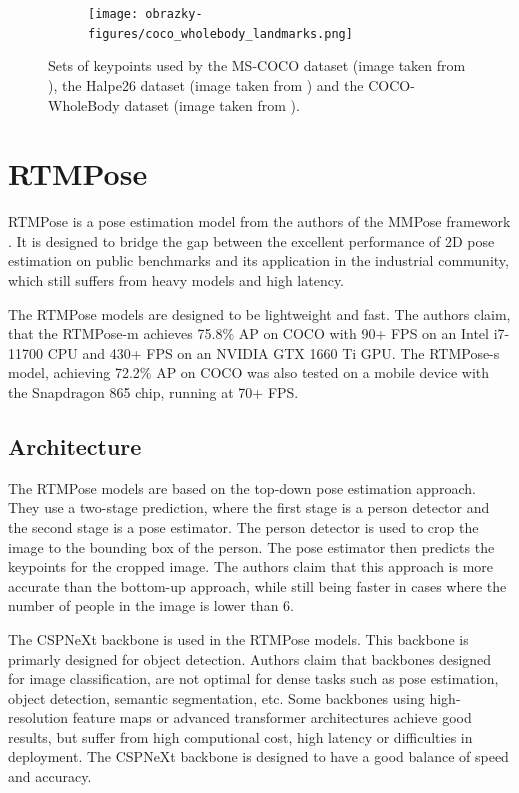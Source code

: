 \begin{figure}[htbp]
\begin{subfigure}[b]{0.5\textwidth}
        \texttt{[image: obrazky-figures/coco\_wholebody\_landmarks.png]}
        \label{fig:image3}
    \end{subfigure}

    \caption{Sets of keypoints used by the MS-COCO dataset (image taken from \cite{coco}), the Halpe26 dataset (image taken from \cite{halpe}) and the COCO-WholeBody dataset (image taken from \cite{halpe}).}
    \label{fig:subfigures}
\end{figure}



\section{RTMPose}
\label{rtmpose}

RTMPose \cite{rtmpose} is a pose estimation model from the authors of the MMPose framework \cite{mmpose2020}. It is designed to bridge the gap between the excellent performance of 2D pose estimation on public benchmarks and its application in the industrial community, which still suffers from heavy models and high latency.

The RTMPose models are designed to be lightweight and fast. The authors claim, that the RTMPose-m achieves 75.8\% AP on COCO with 90+ FPS on an Intel i7-11700 CPU and 430+ FPS on an NVIDIA GTX 1660 Ti GPU. The RTMPose-s model, achieving 72.2\% AP on COCO was also tested on a mobile device with the Snapdragon 865 chip, running at 70+ FPS.

\subsection{Architecture}

The RTMPose models are based on the top-down pose estimation approach. They use a two-stage prediction, where the first stage is a person detector and the second stage is a pose estimator. The person detector is used to crop the image to the bounding box of the person. The pose estimator then predicts the keypoints for the cropped image. The authors claim that this approach is more accurate than the bottom-up approach, while still being faster in cases where the number of people in the image is lower than 6.

The CSPNeXt backbone is used in the RTMPose models. This backbone is primarly designed for object detection. Authors claim that backbones designed for image classification, are not optimal for dense tasks such as pose estimation, object detection, semantic segmentation, etc. Some backbones using high-resolution feature maps or advanced transformer architectures achieve good results, but suffer from high computional cost, high latency or difficulties in deployment. The CSPNeXt backbone is designed to have a good balance of speed and accuracy.

